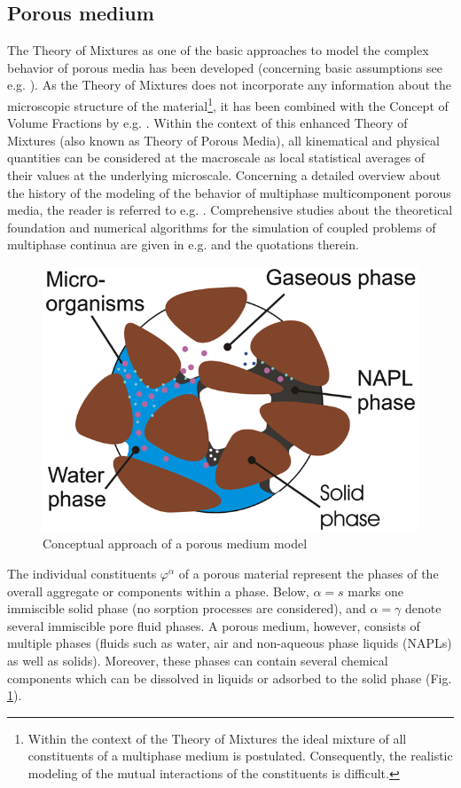 \subsection{Porous medium}

The Theory of Mixtures as one of the basic approaches to model the complex behavior of porous media has been developed (concerning basic assumptions see e.g. \cite{Bow:1976,TT:1960}). As the Theory of Mixtures does not incorporate any information about the microscopic structure of the material\footnote{Within the context of the Theory of Mixtures the ideal mixture of all constituents of a multiphase medium is postulated. Consequently, the realistic modeling of the mutual interactions of the constituents is difficult.}, it has been combined with the Concept of Volume Fractions by e.g. \cite{Bow:1980,BE:1986a,LS:1998,Pre:1980}. Within the context of this enhanced Theory of Mixtures (also known as Theory of Porous Media), all kinematical and physical quantities can be considered at the macroscale as local statistical averages of their values at the underlying microscale.
%
Concerning a detailed overview about the history of the modeling of the behavior of multiphase multicomponent porous media, the reader is referred to e.g. \cite{Boer:2000}. Comprehensive studies about the theoretical foundation and numerical algorithms for the simulation of coupled problems of multiphase continua are given in e.g. \cite{Boer:2000,EB:2002,LS:1998} and the quotations therein. 

\vspace{4cm}
\begin{figure}[htbp]
\hspace{3cm}
\includegraphics[width=0.06\columnwidth]{figures/pm.png}
\caption{Conceptual approach of a porous medium model}
\label{fig:pm1}
\end{figure}

The individual constituents $\varphi^{\alpha}$ of a porous material represent the phases of the overall aggregate or components within a phase. Below, $\alpha=s$ marks one immiscible solid phase (no sorption processes are considered), and $\alpha=\gamma$ denote several immiscible pore fluid phases. 
%
A porous medium, however, consists of multiple phases (fluids such as water, air and non-aqueous phase liquids (NAPLs) as well as solids). 
Moreover, these phases can contain several chemical components which can be dissolved in liquids or adsorbed to the solid phase (Fig. \ref{fig:pm1}).

